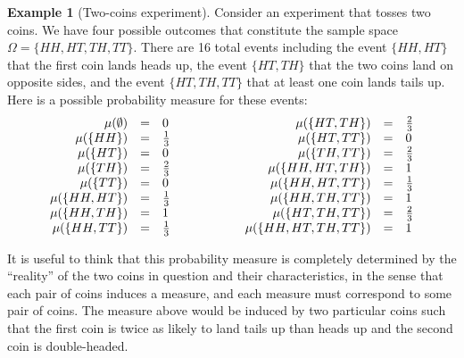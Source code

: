 \documentclass[12pt]{iopart}
\theoremstyle{plain}
\theoremstyle{definition}
\newtheorem{example}[thm]{Example}
\newcommand{\pmeas}{\ensuremath{\mu}}
\begin{document}
\begin{example}[Two-coins experiment]\label{ex1} Consider an
  experiment that tosses two coins. We have four possible outcomes
  that constitute the sample space $\Omega=\{HH,HT,TH,TT\}$. There are
  16 total events including the event $\{HH,HT\}$ that the first coin
  lands heads up, the event $\{HT,TH\}$ that the two coins land on
  opposite sides, and the event $\{HT,TH,TT\}$ that at least one coin
  lands tails up. Here is a possible probability measure for these
  events:
\begin{equation}
\begin{array}{c@{\qquad\qquad}c}
\begin{array}{rcl}
\pmeas(\emptyset) & = & 0\\
\pmeas(\{HH\}) & = & \frac{1}{3}\\
\pmeas(\{HT\}) & = & 0\\
\pmeas(\{TH\}) & = & \frac{2}{3}\\
\pmeas(\{TT\}) & = & 0\\
\pmeas(\{HH,HT\}) & = & \frac{1}{3}\\
\pmeas(\{HH,TH\}) & = & 1\\
\pmeas(\{HH,TT\}) & = & \frac{1}{3}
\end{array} & \begin{array}{rcl}
\pmeas(\{HT,TH\}) & = & \frac{2}{3}\\
\pmeas(\{HT,TT\}) & = & 0\\
\pmeas(\{TH,TT\}) & = & \frac{2}{3}\\
\pmeas(\{HH,HT,TH\}) & = & 1\\
\pmeas(\{HH,HT,TT\}) & = & \frac{1}{3}\\
\pmeas(\{HH,TH,TT\}) & = & 1\\
\pmeas(\{HT,TH,TT\}) & = & \frac{2}{3}\\
\pmeas(\{HH,HT,TH,TT\}) & = & 1
\end{array}\end{array}
\end{equation}
\end{example}

\noindent It is useful to think that this probability measure is
completely determined by the ``reality'' of the two coins in question
and their characteristics, in the sense that each pair of coins
induces a measure, and each measure must correspond to some pair of
coins. The measure above would be induced by two particular coins such
that the first coin is twice as likely to land tails up than heads up
and the second coin is double-headed. 
\end{document}
